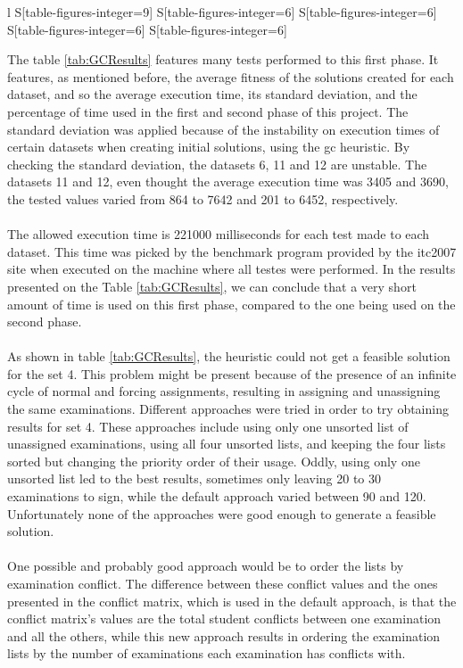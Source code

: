 \begin{table}[t]
\begin{tabular}{%
	 l%
     S[table-figures-integer=9]%
     S[table-figures-integer=6]%
     S[table-figures-integer=6]%
     S[table-figures-integer=6]%
     S[table-figures-integer=6]%
    }
\bottomrule

\end{tabular}

\caption{Some of the Graph Coloring's performance features.}
\label{tab:GCResults}

\end{table}The table \ref{tab:GCResults} features many tests performed to this first phase. It features, as mentioned before, the average fitness of the solutions created for each dataset, and so the average execution time, its standard deviation, and the percentage of time used in the first and second phase of this project. The standard deviation was applied because of the instability on execution times of certain datasets when creating initial solutions, using the \gls{gc} heuristic. By checking the standard deviation, the datasets 6, 11 and 12 are unstable. The datasets 11 and 12, even thought the average execution time was 3405 and 3690, the tested values varied from 864 to 7642 and 201 to 6452, respectively.\\
\\
The allowed execution time is 221000 milliseconds for each test made to each dataset. This time was picked by the benchmark program provided by the \gls{itc2007} site \cite{McCollum2007e} when executed on the machine where all testes were performed. In the results presented on the Table \ref{tab:GCResults}, we can conclude that a very short amount of time is used on this first phase, compared to the one being used on the second phase.\\
\\
As shown in table \ref{tab:GCResults}, the heuristic could not get a feasible solution for the set 4. This problem might be present because of the presence of an infinite cycle of normal and forcing assignments, resulting in assigning and unassigning the same examinations. Different approaches were tried in order to try obtaining results for set 4. These approaches include using only one unsorted list of unassigned examinations, using all four unsorted lists, and keeping the four lists sorted but changing the priority order of their usage. Oddly, using only one unsorted list led to the best results, sometimes only leaving 20 to 30 examinations to sign, while the default approach varied between 90 and 120. Unfortunately none of the approaches were good enough to generate a feasible solution.\\
\\
One possible and probably good approach would be to order the lists by examination conflict. The difference between these conflict values and the ones presented in the conflict matrix, which is used in the default approach, is that the conflict matrix's values are the total student conflicts between one examination and all the others, while this new approach results in ordering the examination lists by the number of examinations each examination has conflicts with.